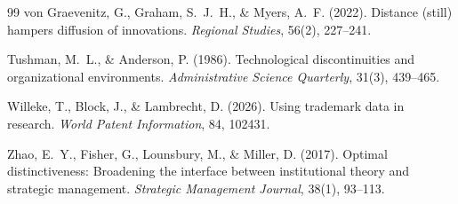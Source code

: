 \documentclass[11pt]{article}
\begin{document}
\begin{thebibliography}{99}
von Graevenitz, G., Graham, S.~J.~H., \& Myers, A.~F. (2022). Distance
(still) hampers diffusion of innovations. \emph{Regional Studies}, 56(2),
227--241.

Tushman, M.~L., \& Anderson, P. (1986). Technological discontinuities and
organizational environments. \emph{Administrative Science Quarterly},
31(3), 439--465.

Willeke, T., Block, J., \& Lambrecht, D. (2026). Using trademark data in
research. \emph{World Patent Information}, 84, 102431.

Zhao, E.~Y., Fisher, G., Lounsbury, M., \& Miller, D. (2017). Optimal
distinctiveness: Broadening the interface between institutional theory and
strategic management. \emph{Strategic Management Journal}, 38(1), 93--113.

\end{thebibliography}
\end{document}
